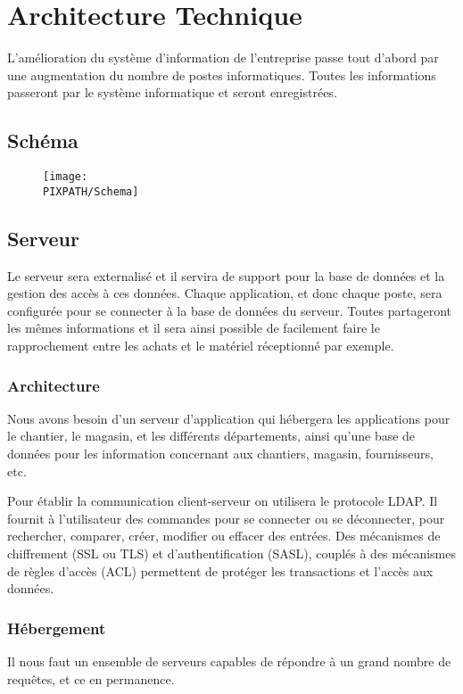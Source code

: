 \documentclass [a4paper] {report}
\begin{document}
\section{Architecture Technique}
L'amélioration du système d’information de l'entreprise passe tout d'abord par une augmentation du nombre de postes
informatiques. Toutes les informations passeront par le système informatique et seront enregistrées.

\subsection{Schéma}

 \begin{figure}[!h]
    \begin{center}
    \texttt{[image: \\PIXPATH/Schema]}
    \caption{}
    \end{center}
    \end{figure}


\subsection{Serveur}

Le serveur sera externalisé et il servira de support pour la base de données et la gestion des accès à ces données. 
Chaque application, et donc chaque poste, sera configurée pour se connecter à la base de données du serveur. 
Toutes partageront les mêmes informations et il sera ainsi possible de facilement faire le rapprochement entre 
les achats et le matériel réceptionné par exemple.

	\subsubsection{Architecture}
Nous avons besoin d'un serveur d'application qui hébergera les applications pour le chantier, le magasin, et les différents 
départements,  ainsi qu'une base de données pour les information concernant aux chantiers, magasin, fournisseurs, etc. 

Pour établir la communication client-serveur on utilisera le protocole LDAP. Il fournit à l'utilisateur des commandes 
pour se connecter ou se déconnecter,  pour rechercher, comparer, créer, modifier ou effacer des entrées. 
Des mécanismes de chiffrement (SSL ou TLS) et d'authentification (SASL), couplés à des mécanismes de règles d'accès (ACL) 
permettent de protéger les transactions et l'accès aux données.

	\subsubsection{Hébergement}
    Il nous faut un ensemble de serveurs capables de répondre à un grand
    nombre de requêtes, et ce en permanence.
\end{document}
